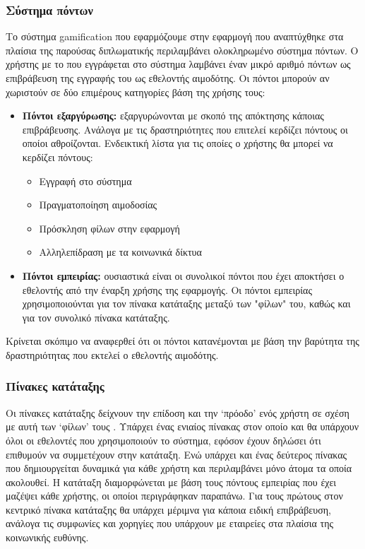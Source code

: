 	\subsubsection{Σύστημα πόντων}\label{sssect:point_system}
	Το σύστημα gamification που εφαρμόζουμε στην εφαρμογή που αναπτύχθηκε στα πλαίσια της παρούσας διπλωματικής περιλαμβάνει ολοκληρωμένο σύστημα πόντων. Ο χρήστης με το που εγγράφεται στο σύστημα λαμβάνει έναν μικρό αριθμό πόντων ως επιβράβευση της εγγραφής του ως εθελοντής αιμοδότης. Οι πόντοι μπορούν αν χωριστούν σε δύο επιμέρους κατηγορίες βάση της χρήσης τους:
	\begin{itemize}
		\item \textbf{Πόντοι εξαργύρωσης:} εξαργυρώνονται με σκοπό της απόκτησης κάποιας επιβράβευσης. Ανάλογα με τις δραστηριότητες που επιτελεί κερδίζει πόντους οι οποίοι αθροίζονται. Ενδεικτική λίστα για τις οποίες ο χρήστης θα μπορεί να κερδίζει πόντους:
		\begin{itemize}
			\item Εγγραφή στο σύστημα
			\item Πραγματοποίηση αιμοδοσίας
			\item Πρόσκληση φίλων στην εφαρμογή
			\item Αλληλεπίδραση με τα κοινωνικά δίκτυα
		\end{itemize}
		\item \textbf{Πόντοι εμπειρίας:} ουσιαστικά είναι οι συνολικοί πόντοι που έχει αποκτήσει ο εθελοντής από την έναρξη χρήσης της εφαρμογής. Οι πόντοι εμπειρίας χρησιμοποιούνται για τον πίνακα κατάταξης μεταξύ των "φίλων" του, καθώς και για τον συνολικό πίνακα κατάταξης.
	\end{itemize}
	Κρίνεται σκόπιμο να αναφερθεί ότι οι πόντοι κατανέμονται με βάση την βαρύτητα της δραστηριότητας που εκτελεί ο εθελοντής αιμοδότης.
	
	\subsubsection{Πίνακες κατάταξης}
	Οι πίνακες κατάταξης δείχνουν την επίδοση και την `πρόοδο' ενός χρήστη σε σχέση με αυτή των `φίλων' τους \cite{Liu:2011:GIE:2072652.2072655}. Υπάρχει ένας ενιαίος πίνακας στον οποίο και θα υπάρχουν όλοι οι εθελοντές που χρησιμοποιούν το σύστημα, εφόσον έχουν δηλώσει ότι επιθυμούν να συμμετέχουν στην κατάταξη. Ενώ υπάρχει και ένας δεύτερος πίνακας που δημιουργείται δυναμικά για κάθε χρήστη και περιλαμβάνει μόνο άτομα τα οποία ακολουθεί. Η κατάταξη διαμορφώνεται με βάση τους πόντους εμπειρίας που έχει μαζέψει κάθε χρήστης, οι οποίοι περιγράφηκαν παραπάνω. Για τους πρώτους στον κεντρικό πίνακα κατάταξης  θα υπάρχει μέριμνα για κάποια ειδική επιβράβευση, ανάλογα τις συμφωνίες και χορηγίες που υπάρχουν με εταιρείες στα πλαίσια της κοινωνικής ευθύνης.
	
